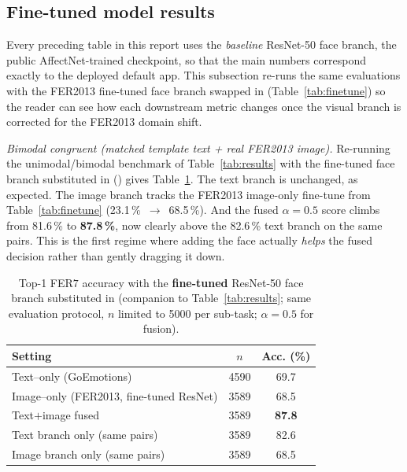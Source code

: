 \documentclass[sigconf,nonacm]{acmart}
\begin{document}
\subsection{Fine-tuned model results}\label{sec:finetuned}
Every preceding table in this report uses the \emph{baseline} ResNet-50 face branch, the public AffectNet-trained  checkpoint, so that the main numbers correspond exactly to the deployed default app. This subsection re-runs the same evaluations with the FER2013 fine-tuned face branch swapped in (Table~\ref{tab:finetune}) so the reader can see how each downstream metric changes once the visual branch is corrected for the FER2013 domain shift.

\emph{Bimodal congruent (matched template text + real FER2013 image).} Re-running the unimodal/bimodal benchmark of Table~\ref{tab:results} with the fine-tuned face branch substituted in () gives Table~\ref{tab:resultsft}. The text branch is unchanged, as expected. The image branch tracks the FER2013 image-only fine-tune from Table~\ref{tab:finetune} (23.1\,\%~$\to$~68.5\,\%). And the fused $\alpha\!=\!0.5$ score climbs from 81.6\,\% to \textbf{87.8\,\%}, now clearly above the 82.6\,\% text branch on the same pairs. This is the first regime where adding the face actually \emph{helps} the fused decision rather than gently dragging it down.

\begin{table}[t]
  \centering
  \small
  \caption{Top-1 FER$7$ accuracy with the \textbf{fine-tuned} ResNet-50 face branch substituted in (companion to Table~\ref{tab:results}; same evaluation protocol, $n$ limited to 5000 per sub-task; $\alpha\!=\!0.5$ for fusion).}
  \label{tab:resultsft}
  \begin{tabular}{@{}lcc@{}}
    \toprule
    \textbf{Setting} & \textbf{$n$} & \textbf{Acc. (\%)} \\
    \midrule
    Text--only (GoEmotions)                   & 4590 & 69.7 \\
    Image--only (FER2013, fine-tuned ResNet)  & 3589 & 68.5 \\
    Text$+$image fused                        & 3589 & \textbf{87.8} \\
    \midrule
    Text branch only (same pairs)             & 3589 & 82.6 \\
    Image branch only (same pairs)            & 3589 & 68.5 \\
    \bottomrule
  \end{tabular}
\end{table}
\end{document}
